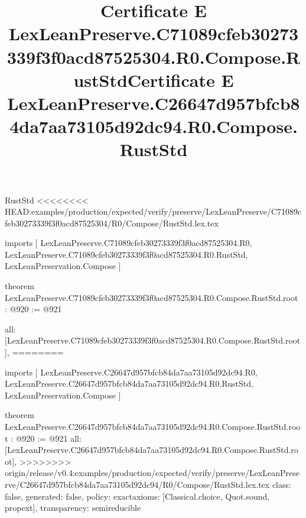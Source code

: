 \begin{lexlean}{RustStd}
<<<<<<<< HEAD:examples/production/expected/verify/preserve/LexLeanPreserve/C71089cfeb30273339f3f0acd87525304/R0/Compose/RustStd.lex.tex
\title{Certificate E LexLeanPreserve.C71089cfeb30273339f3f0acd87525304.R0.Compose.RustStd}
\begin{coremodule}
imports [
  LexLeanPreserve.C71089cfeb30273339f3f0acd87525304.R0,
  LexLeanPreserve.C71089cfeb30273339f3f0acd87525304.R0.RustStd,
  LexLeanPreservation.Compose
]

theorem LexLeanPreserve.C71089cfeb30273339f3f0acd87525304.R0.Compose.RustStd.root : @920 := @921 {
  all: [LexLeanPreserve.C71089cfeb30273339f3f0acd87525304.R0.Compose.RustStd.root],
========
\title{Certificate E LexLeanPreserve.C26647d957bfcb84da7aa73105d92dc94.R0.Compose.RustStd}
\begin{coremodule}
imports [
  LexLeanPreserve.C26647d957bfcb84da7aa73105d92dc94.R0,
  LexLeanPreserve.C26647d957bfcb84da7aa73105d92dc94.R0.RustStd,
  LexLeanPreservation.Compose
]

theorem LexLeanPreserve.C26647d957bfcb84da7aa73105d92dc94.R0.Compose.RustStd.root : @920 := @921 {
  all: [LexLeanPreserve.C26647d957bfcb84da7aa73105d92dc94.R0.Compose.RustStd.root],
>>>>>>>> origin/release/v0.4:examples/production/expected/verify/preserve/LexLeanPreserve/C26647d957bfcb84da7aa73105d92dc94/R0/Compose/RustStd.lex.tex
  class: false,
  generated: false,
  policy: exact{axioms: [Classical.choice, Quot.sound, propext]},
  transparency: semireducible
}


\end{coremodule}}
\end{coremodule}
\end{lexlean}
